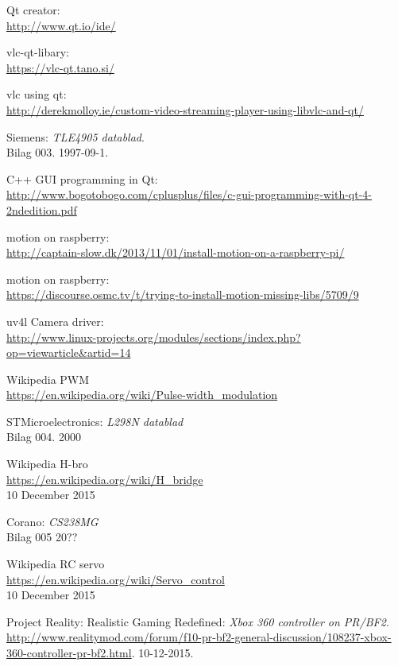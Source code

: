 \begin{thebibliography}{2}
 Qt creator: \\
\url{http://www.qt.io/ide/}

 vlc-qt-libary: \\
\url{https://vlc-qt.tano.si/}

 vlc using qt: \\
\url{http://derekmolloy.ie/custom-video-streaming-player-using-libvlc-and-qt/}

 Siemens: \textit{TLE4905 datablad}. \\
Bilag 003. 1997-09-1.

 C++ GUI programming in Qt: \\
\url{http://www.bogotobogo.com/cplusplus/files/c-gui-programming-with-qt-4-2ndedition.pdf}

 motion on raspberry: \\
\url{http://captain-slow.dk/2013/11/01/install-motion-on-a-raspberry-pi/}

 motion on raspberry: \\
\url{https://discourse.osmc.tv/t/trying-to-install-motion-missing-libs/5709/9}

 uv4l Camera driver: \\
\url{http://www.linux-projects.org/modules/sections/index.php?op=viewarticle&artid=14}

 Wikipedia PWM \\
\url{https://en.wikipedia.org/wiki/Pulse-width_modulation}

 STMicroelectronics: \textit{L298N datablad} \\
Bilag 004. 2000

 Wikipedia H-bro \\
\url{https://en.wikipedia.org/wiki/H_bridge}\\
10 December 2015

 Corano: \textit{CS238MG}\\
Bilag 005 20??

 Wikipedia RC servo \\
\url{https://en.wikipedia.org/wiki/Servo_control}\\
10 December 2015

 Project Reality: Realistic Gaming Redefined: \textit{Xbox 360 controller on PR/BF2}. \\
\url{http://www.realitymod.com/forum/f10-pr-bf2-general-discussion/108237-xbox-360-controller-pr-bf2.html}. 10-12-2015.


\end{thebibliography}
